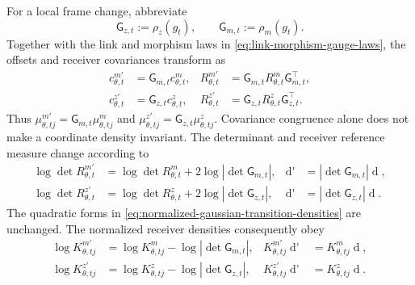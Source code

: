 For a local frame change, abbreviate
\begin{equation}
\mathsf G_{z,t}:=\rho_z(g_t),
\qquad
\mathsf G_{m,t}:=\rho_m(g_t).
\label{eq:generative-coordinate-change-matrices}
\end{equation}
Together with the link and morphism laws in \cref{eq:link-morphism-gauge-laws}, the offsets and receiver covariances transform as
\begin{equation}
\begin{aligned}
c_{\theta,t}^{m\prime}&=\mathsf G_{m,t}c_{\theta,t}^m,
&R_{\theta,t}^{m\prime}
&=\mathsf G_{m,t}R_{\theta,t}^m\mathsf G_{m,t}^{\top},\\
c_{\theta,t}^{z\prime}&=\mathsf G_{z,t}c_{\theta,t}^z,
&R_{\theta,t}^{z\prime}
&=\mathsf G_{z,t}R_{\theta,t}^z\mathsf G_{z,t}^{\top}.
\end{aligned}
\label{eq:transition-offset-covariance-gauge-laws}
\end{equation}
Thus $\mu_{\theta,tj}^{m\prime}=\mathsf G_{m,t}\mu_{\theta,tj}^m$ and $\mu_{\theta,tj}^{z\prime}=\mathsf G_{z,t}\mu_{\theta,tj}^z$.  Covariance congruence alone does not make a coordinate density invariant.  The determinant and receiver reference measure change according to
\begin{equation}
\begin{aligned}
\log\det R_{\theta,t}^{m\prime}
&=\log\det R_{\theta,t}^m+2\log|\det\mathsf G_{m,t}|,
&\mathop{\mathrm d\lambda_{m,t}'(m_t')}
&=|\det\mathsf G_{m,t}|\mathop{\mathrm d\lambda_{m,t}(m_t)},\\
\log\det R_{\theta,t}^{z\prime}
&=\log\det R_{\theta,t}^z+2\log|\det\mathsf G_{z,t}|,
&\mathop{\mathrm d\lambda_{z,t}'(z_t')}
&=|\det\mathsf G_{z,t}|\mathop{\mathrm d\lambda_{z,t}(z_t)}.
\end{aligned}
\label{eq:receiver-logdet-measure-jacobians}
\end{equation}
The quadratic forms in \cref{eq:normalized-gaussian-transition-densities} are unchanged.  The normalized receiver densities consequently obey
\begin{equation}
\begin{aligned}
\log K_{\theta,tj}^{m\prime}
&=\log K_{\theta,tj}^m-\log|\det\mathsf G_{m,t}|,
&K_{\theta,tj}^{m\prime}\mathop{\mathrm d\lambda_{m,t}' }
&=K_{\theta,tj}^m\mathop{\mathrm d\lambda_{m,t}},\\
\log K_{\theta,tj}^{z\prime}
&=\log K_{\theta,tj}^z-\log|\det\mathsf G_{z,t}|,
&K_{\theta,tj}^{z\prime}\mathop{\mathrm d\lambda_{z,t}' }
&=K_{\theta,tj}^z\mathop{\mathrm d\lambda_{z,t}}.
\end{aligned}
\label{eq:receiver-density-kernel-measure-invariance}
\end{equation}
